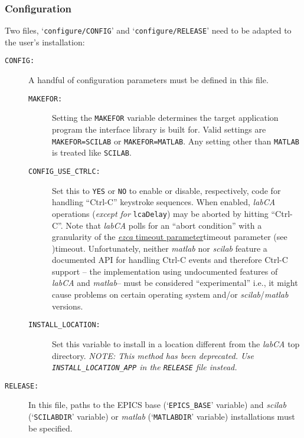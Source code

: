 \documentclass{article}
\newcommand{\sca}{\ita{labCA}}
\newcommand{\scilab}{\ita{scilab}}
\newcommand{\matlab}{\ita{matlab}}
\newcommand{\ezca}{\ita{ezca}}
\newcommand{\com}[1]{{\tt #1}}
\newcommand{\ita}[1]{\emph{#1}}
\begin{document}
\subsubsection{Configuration}
Two files, `\com{configure/CONFIG}' and `\com{configure/RELEASE}' need to
be adapted to the user's installation:
\begin{description}
\item[\tt CONFIG:] A handful of configuration parameters must be defined
in this file.
\begin{description}
\item[\tt MAKEFOR:] Setting the \com{MAKEFOR} variable
determines the target application program the interface library is
built for. Valid settings are \com{MAKEFOR=SCILAB} or \com{MAKEFOR=MATLAB}.
Any setting other than \com{MATLAB} is treated like \com{SCILAB}.

\item[\tt CONFIG\_USE\_CTRLC:] Set this to {\tt YES} or {\tt NO} to enable
or disable, respectively, code for handling ``Ctrl-C'' keystroke sequences.
When enabled, \sca{} operations ({\em except for} \com{lcaDelay}) may be aborted
by hitting ``Ctrl-C''.
Note that \sca{} polls for an ``abort condition'' with a granularity of the
\hyperref[ref]{\ezca{} timeout parameter}{timeout parameter (see }{ )}{timeout}.
Unfortunately, neither \matlab{} nor \scilab{} feature a documented API for handling
Ctrl-C events and therefore Ctrl-C support -- the implementation using undocumented
features of \sca{} and \matlab -- must be considered ``experimental''
i.e., it might cause problems on certain operating system and/or \scilab/\matlab{}
versions.

\item[\tt INSTALL\_LOCATION:] Set this variable to install in a location
different from the \sca{} top directory. {\em NOTE: This method has been
deprecated. Use \com{INSTALL\_LOCATION\_APP} in the \com{RELEASE} file
instead.}
\end{description}
%
%
\item[\tt RELEASE:] In this file, paths to the EPICS base (`\com{EPICS\_BASE}'
variable) and \scilab{} (`\com{SCILABDIR}' variable) or \matlab{} (`\com{MATLABDIR}'
variable) installations must be specified.


\end{description}
\end{document}
